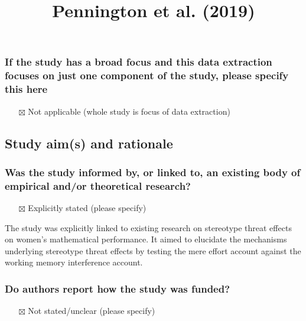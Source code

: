 \documentclass[
  doc, a4paper]{apa7}
\title{Pennington et al. (2019)}
\author{\phantom{0}}
\date{}
\affiliation{\phantom{0}}
\providecommand{\tightlist}{%
  \setlength{\itemsep}{0pt}\setlength{\parskip}{0pt}}
\begin{document}
\maketitle

\subsubsection{If the study has a broad focus and this data extraction focuses on just one component of the study, please specify this here}\label{if-the-study-has-a-broad-focus-and-this-data-extraction-focuses-on-just-one-component-of-the-study-please-specify-this-here}

\begin{itemize}
\tightlist
\item[$\boxtimes$]
  Not applicable (whole study is focus of data extraction)
\end{itemize}

\subsection{Study aim(s) and rationale}\label{study-aims-and-rationale}

\subsubsection{Was the study informed by, or linked to, an existing body of empirical and/or theoretical research?}\label{was-the-study-informed-by-or-linked-to-an-existing-body-of-empirical-andor-theoretical-research}

\begin{itemize}
\tightlist
\item[$\boxtimes$]
  Explicitly stated (please specify)
\end{itemize}

The study was explicitly linked to existing research on stereotype threat effects on women's mathematical performance. It aimed to elucidate the mechanisms underlying stereotype threat effects by testing the mere effort account against the working memory interference account.

\subsubsection{Do authors report how the study was funded?}\label{do-authors-report-how-the-study-was-funded}

\begin{itemize}
\tightlist
\item[$\boxtimes$]
  Not stated/unclear (please specify)
\end{itemize}
\end{document}
